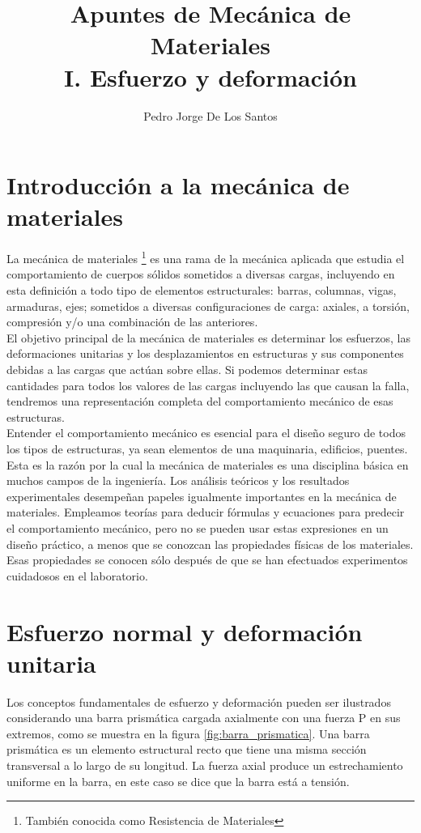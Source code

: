 \documentclass[12pt,letterpaper]{article}
\author{Pedro Jorge De Los Santos}
\title{
{\bf\Large Apuntes de Mecánica de Materiales} \\
{\large I. Esfuerzo y deformación}
}
\begin{document}
\maketitle
\tableofcontents

\section{Introducción a la mecánica de materiales}

La mecánica de materiales \footnote{También conocida como Resistencia de Materiales} es una rama de la 
mecánica aplicada que estudia el comportamiento de cuerpos sólidos sometidos a diversas cargas, incluyendo 
en esta definición a todo tipo de elementos estructurales: barras, columnas, vigas, armaduras, ejes; sometidos a 
diversas configuraciones de carga: axiales, a torsión, compresión y/o una combinación de las anteriores. \\

El objetivo principal de la mecánica de materiales es determinar los esfuerzos, las deformaciones 
unitarias y los desplazamientos en estructuras y sus componentes debidas a las cargas que actúan sobre 
ellas. Si podemos determinar estas cantidades para todos los valores de las cargas incluyendo las 
que causan la falla, tendremos una representación completa del comportamiento mecánico de esas estructuras. \\

Entender el comportamiento mecánico es esencial para el diseño seguro de todos los tipos de estructuras, ya sean 
elementos de una maquinaria, edificios, puentes. Esta es la razón por la cual la mecánica de materiales es una 
disciplina básica en muchos campos de la ingeniería. Los análisis teóricos y los resultados experimentales 
desempeñan papeles igualmente importantes en la mecánica de materiales. Empleamos teorías para deducir fórmulas 
y ecuaciones para predecir el comportamiento mecánico, pero no se pueden usar estas expresiones en un diseño 
práctico, a menos que se conozcan las propiedades físicas de los materiales. Esas propiedades se conocen 
sólo después de que se han efectuados experimentos cuidadosos en el laboratorio.


\section{Esfuerzo normal y deformación unitaria}

Los conceptos fundamentales de esfuerzo y deformación pueden ser ilustrados considerando una barra 
prismática cargada axialmente con una fuerza P en sus extremos, como se muestra en la figura 
\ref{fig:barra_prismatica}. Una barra prismática es un elemento estructural recto que tiene una 
misma sección transversal a lo largo de su longitud. La fuerza axial produce un estrechamiento uniforme 
en la barra, en este caso se dice que la barra está a tensión.
\end{document}
